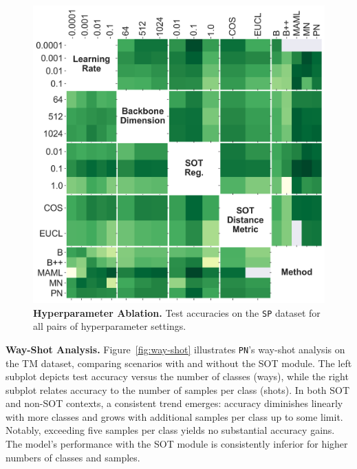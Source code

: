 \begin{figure}[h!]
    \centering
    \includegraphics[width=1\columnwidth]{figures/hparams-interaction-combined.png}
    \caption{\textbf{Hyperparameter Ablation.} Test accuracies on the \texttt{SP} dataset for all pairs of hyperparameter settings.}
    \label{fig:hparams-swissprot-grid}
\end{figure}



\textbf{Way-Shot Analysis.} Figure~\ref{fig:way-shot} illustrates \texttt{PN}'s way-shot analysis on the TM dataset, comparing scenarios with and without the SOT module. The left subplot depicts test accuracy versus the number of classes (ways), while the right subplot relates accuracy to the number of samples per class (shots). In both SOT and non-SOT contexts, a consistent trend emerges: accuracy diminishes linearly with more classes and grows with additional samples per class up to some limit. Notably, exceeding five samples per class yields no substantial accuracy gains. The model's performance with the SOT module is consistently inferior for higher numbers of classes and samples.

